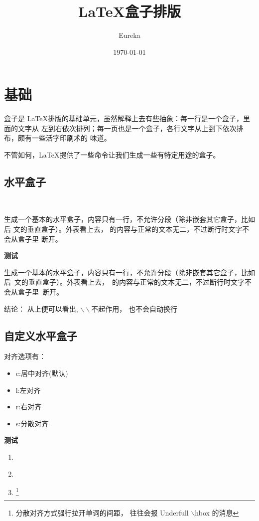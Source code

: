 \documentclass[fontset=windows]{article}
\title{\LaTeX 盒子排版}
\author{Eureka}
\date{\today}
\begin{document}
\maketitle
\tableofcontents

\section{基础}
盒子是 \LaTeX 排版的基础单元，虽然解释上去有些抽象：每一行是一个盒子，里面的文字从
左到右依次排列；每一页也是一个盒子，各行文字从上到下依次排布，颇有一些活字印刷术的
味道。\par
不管如何，\LaTeX 提供了一些命令让我们生成一些有特定用途的盒子。
\subsection{水平盒子}
\begin{command}
    \marg*{\ldots} \\
    \marg*{\ldots}
\end{command}
 生成一个基本的水平盒子，内容只有一行，不允许分段（除非嵌套其它盒子，比如后
文的垂直盒子）。外表看上去， 的内容与正常的文本无二，不过断行时文字不会从盒子里
断开。

\textbf{测试}\par
\mbox{生成一个基本的水平盒子，内容只有一行，不允许分段（除非嵌套其它盒子，比如后
文的垂直盒子）。\\外表看上去， 的内容与正常的文本无二，不过断行时文字不会从盒子里
断开。
}

{
    \kaishu
    \textsf{结论：}
    从上便可以看出, $\backslash \backslash$不起作用， 也不会自动换行
}

\subsection{自定义水平盒子}
对齐选项有：
\begin{itemize}
    \item c:居中对齐(默认)
    \item l:左对齐
    \item r:右对齐
    \item s:分散对齐
\end{itemize}
\textbf{测试}\par

\begin{enumerate}
    \item {}
    \item {}\\
    \item {}\footnote[1]
    {分散对齐方式强行拉开单词的间距，
    往往会报 Underfull $\backslash$hbox 的消息}
\end{enumerate}    
\end{document}
